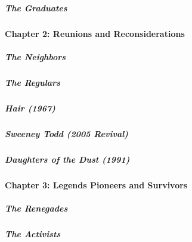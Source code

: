\hypertarget{the-graduates}{%
\subparagraph{The Graduates}\label{the-graduates}}

\hypertarget{chapter-2-reunions-and-reconsiderations}{%
\paragraph{Chapter 2: Reunions and
Reconsiderations}\label{chapter-2-reunions-and-reconsiderations}}

\href{/interactive/2020/04/13/t-magazine/ninth-street-greenwich-village-neighbors.html}{}

\hypertarget{the-neighbors}{%
\subparagraph{The Neighbors}\label{the-neighbors}}

\href{/interactive/2020/04/13/t-magazine/omen-restaurant-nyc.html}{}

\hypertarget{the-regulars}{%
\subparagraph{The Regulars}\label{the-regulars}}

\href{/interactive/2020/04/13/t-magazine/hair-musical-broadway.html}{}

\hypertarget{hair-1967}{%
\subparagraph{Hair (1967)}\label{hair-1967}}

\href{/interactive/2020/04/13/t-magazine/sweeney-todd-revival.html}{}

\hypertarget{sweeney-todd-2005-revival}{%
\subparagraph{Sweeney Todd (2005
Revival)}\label{sweeney-todd-2005-revival}}

\href{/interactive/2020/04/13/t-magazine/daughters-of-the-dust.html}{}

\hypertarget{daughters-of-the-dust-1991}{%
\subparagraph{Daughters of the Dust
(1991)}\label{daughters-of-the-dust-1991}}

\hypertarget{chapter-3-legends-pioneers-and-survivors}{%
\paragraph{Chapter 3: Legends Pioneers and
Survivors}\label{chapter-3-legends-pioneers-and-survivors}}

\href{/interactive/2020/04/13/t-magazine/butch-stud-lesbian.html}{}

\hypertarget{the-renegades}{%
\subparagraph{The Renegades}\label{the-renegades}}

\href{/interactive/2020/04/13/t-magazine/act-up-aids.html}{}

\hypertarget{the-activists}{%
\subparagraph{The Activists}\label{the-activists}}

\href{/interactive/2020/04/13/t-magazine/artist-recluse.html}{}


